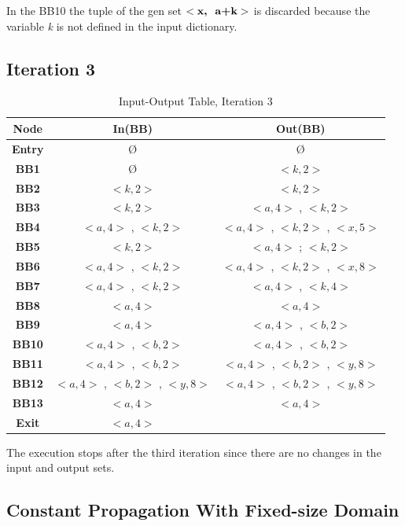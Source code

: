\documentclass[a4paper,12pt,numbers=noenddot]{scrreprt}
\begin{document}
            In the BB10 the tuple of the gen set $<\textbf{x,\; a+k}>$ is discarded because the variable \textit{k} is not defined in the input dictionary.
            
    
    \subsection*{Iteration 3}

        \begin{table}[H]
            \centering
            \begin{tabular}{|c|c|c|}
                \hline
                \textbf{Node} & \textbf{In(BB)} & \textbf{Out(BB)} \\
                \hline
                \textbf{Entry} & Ø & Ø \\
                \textbf{BB1}   & Ø & $<k, 2>$ \\
                \textbf{BB2}   & $<k, 2>$ & $<k, 2>$ \\
                \textbf{BB3}   & $<k, 2>$ & $<a, 4>$ , $<k, 2>$  \\
                \textbf{BB4}   & $<a, 4>$ , $<k, 2>$ & $<a, 4>$ , $<k, 2>$ , $<x, 5>$ \\
                \textbf{BB5}   & $<k, 2>$ &  $<a, 4>$ ; $<k, 2>$ \\
                \textbf{BB6}   & $<a, 4>$ , $<k, 2>$ & $<a, 4>$ , $<k, 2>$ , $<x, 8>$ \\
                \textbf{BB7}   & $<a, 4>$ , $<k, 2>$ & $<a, 4>$ , $<k, 4>$ \\
                \textbf{BB8}   & $<a, 4>$ & $<a, 4>$ \\
                \textbf{BB9}   & $<a, 4>$ & $<a, 4>$ , $<b, 2>$ \\
                \textbf{BB10}  & $<a, 4>$ , $<b, 2>$ & $<a, 4>$ , $<b, 2>$ \\
                \textbf{BB11}  & $<a, 4>$ , $<b, 2>$ & $<a, 4>$ , $<b, 2>$ , $<y, 8>$ \\
                \textbf{BB12}  & $<a, 4>$ , $<b, 2>$ , $<y, 8>$ & $<a, 4>$ , $<b, 2>$ , $<y, 8>$ \\
                \textbf{BB13}  & $<a, 4>$ & $<a, 4>$ \\
                \textbf{Exit}  & $<a, 4>$ & \\
                \hline
            \end{tabular}
            \caption{Input-Output Table, Iteration 3}
            \label{tab:cp_input_output_table3}
        \end{table}

        The execution stops after the third iteration since there are no changes in the input and output sets.
    

        \subsection*{Constant Propagation With Fixed-size Domain}\label{chap:Constant Propagation with Fixed-size Domain}
\end{document}
